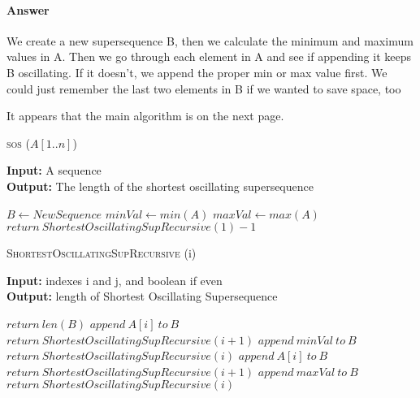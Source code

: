 \documentclass{article}
\begin{document}
\paragraph{Answer}

We create a new supersequence B, then we calculate the minimum and maximum values in A.
Then we go through each element in A and see if appending it keeps B oscillating. If it
doesn't, we append the proper min or max value first. We could just remember the last two
elements in B if we wanted to save space, too

It appears that the main algorithm is on the next page.

\begin{algorithm} \caption{\textsc{sos} ($A[1..n]$)}\label{alg:seb}
    {\bf Input:} A sequence\\
    {\bf Output:} The length of the shortest oscillating supersequence
    \begin{algorithmic}[1]
        \State$B \gets NewSequence$
        \State$minVal \gets min(A)$
        \State$maxVal \gets max(A)$
        \State$return\ ShortestOscillatingSupRecursive(1) -1$
    \end{algorithmic}
\end{algorithm}

\begin{algorithm} \caption{\textsc{ShortestOscillatingSupRecursive} (i)}\label{alg:seb}
    {\bf Input:} indexes i and j, and boolean if even\\
    {\bf Output:} length of Shortest Oscillating Supersequence
    \begin{algorithmic}[1]
            \State$return\ len(B)$
        \Else{}
                    \State$append\ A[i]\ to\ B$
                    \State$return\ ShortestOscillatingSupRecursive(i+1)$
                \Else{}
                    \State$append\ minVal\ to\ B$
                    \State$return\ ShortestOscillatingSupRecursive(i)$
                \EndIf{}
            \Else{}
                    \State$append\ A[i]\ to\ B$
                    \State$return\ ShortestOscillatingSupRecursive(i+1)$
                \Else{}
                    \State$append\ maxVal\ to\ B$
                    \State$return\ ShortestOscillatingSupRecursive(i)$
                \EndIf{}
            \EndIf{}
        \EndIf{}
    \end{algorithmic}
\end{algorithm}
\end{document}

